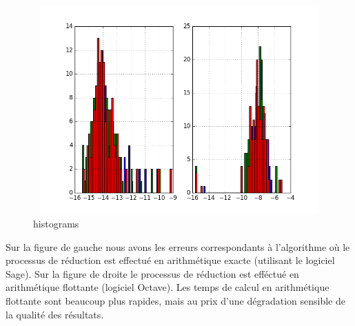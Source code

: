 \documentclass{standalone}
\begin{document}
\begin{figure}[!ht]
  \includegraphics[height=8cm, width=1.2\textwidth]{../png/ref.png}
  \caption{histograms}
\end{figure}


Sur la figure de gauche nous avons les erreurs correspondants à l'algorithme o\`u le processus de réduction est effectué en arithmétique exacte (utilisant le logiciel Sage). Sur la figure de droite le processus de réduction est efféctué en arithmétique flottante (logiciel Octave).
Les temps de calcul en arithmétique flottante sont beaucoup plus rapides, mais au prix d'une dégradation sensible de la qualité des résultats.
\end{document}
